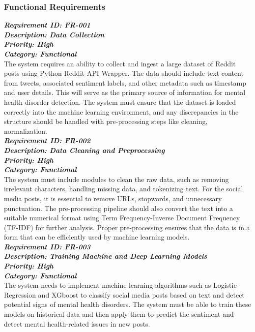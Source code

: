 
\subsubsection{Functional Requirements}

\noindent
\textbf{\emph{Requirement ID: FR-001}} \\ 
\textbf{\emph{Description: Data Collection}} \\
\textbf{\emph{Priority: High}} \\
\textbf{\emph{Category: Functional}} \\
\noindent
The system requires an ability to collect and ingest a large dataset of Reddit posts using Python Reddit API Wrapper. The data should include text content from tweets, associated sentiment labels, and other metadata such as timestamp and user details. This will serve as the primary source of information for mental health disorder detection. The system must ensure that the dataset is loaded correctly into the machine learning environment, and any discrepancies in the structure should be handled with pre-processing steps like cleaning, normalization. \\

\noindent
\textbf{\emph{Requirement ID: FR-002}} \\ 
\textbf{\emph{Description: Data Cleaning and Preprocessing}} \\
\textbf{\emph{Priority: High}} \\
\textbf{\emph{Category: Functional}} \\
\noindent
The system must include modules to clean the raw data, such as removing irrelevant characters, handling missing data, and tokenizing text. For the social media posts, it is essential to remove URLs, stopwords, and unnecessary punctuation. The pre-processing pipeline should also convert the text into a suitable numerical format using Term Frequency-Inverse Document Frequency (TF-IDF) for further analysis. Proper pre-processing ensures that the data is in a form that can be efficiently used by machine learning models. \\

\noindent
\textbf{\emph{Requirement ID: FR-003}} \\ 
\textbf{\emph{Description: Training Machine and Deep Learning Models}} \\
\textbf{\emph{Priority: High}} \\
\textbf{\emph{Category: Functional}} \\
\noindent
The system needs to implement machine learning algorithms such as Logistic Regression and XGboost to classify social media posts based on text and detect potential signs of mental health disorders. The system must be able to train these models on historical data and then apply them to predict the sentiment and detect mental health-related issues in new posts. \\


